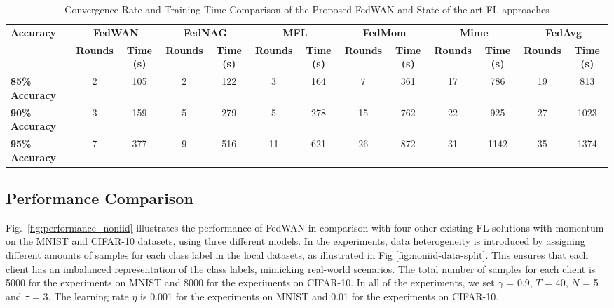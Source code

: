 \documentclass[journal]{IEEEtran}
\begin{document}
\begin{table}[!t]
\centering
\caption{Convergence Rate and Training Time Comparison of the Proposed FedWAN and State-of-the-art FL approaches}
\label{tab:convergence_rate}
\begin{tabular}{lcccccccccccc}
\toprule
\textbf{Accuracy} & \multicolumn{2}{c}{\textbf{FedWAN}} & \multicolumn{2}{c}{\textbf{FedNAG}} & \multicolumn{2}{c}{\textbf{MFL}}  & \multicolumn{2}{c}{\textbf{FedMom}} & \multicolumn{2}{c}{\textbf{Mime}} & \multicolumn{2}{c}{\textbf{FedAvg}} \\
\cmidrule(lr){2-3} \cmidrule(lr){4-5} \cmidrule(lr){6-7} \cmidrule(lr){8-9} \cmidrule(lr){10-11} \cmidrule(lr){12-13}
 & \textbf{Rounds} & \textbf{Time (s)} & \textbf{Rounds} & \textbf{Time (s)} & \textbf{Rounds} & \textbf{Time (s)}  & \textbf{Rounds} & \textbf{Time (s)} & \textbf{Rounds} & \textbf{Time (s)} & \textbf{Rounds} & \textbf{Time (s)} \\
\midrule
\textbf{85\% Accuracy} & 2  & 105  & 2  & 122  & 3  & 164 
                       & 7  & 361  & 17  & 786 & 19  & 813  \\
\textbf{90\% Accuracy} & 3  & 159  & 5  & 279  & 5  & 278  
                       & 15  & 762  & 22  & 925  & 27  & 1023  \\
\textbf{95\% Accuracy} & 7  & 377  & 9  & 516  & 11  & 621  
                       & 26  & 872  & 31  & 1142  & 35  & 1374  \\
\bottomrule
\end{tabular}
\label{tab:fl-accuracy-threshold}
\end{table}

\subsection{Performance Comparison}
Fig.~\ref{fig:performance_noniid} illustrates the performance of FedWAN in comparison with four other existing FL solutions with momentum on the MNIST and CIFAR-10 datasets, using three different models. In the experiments, data heterogeneity is introduced by assigning different amounts of samples for each class label in the local datasets, as illustrated in Fig \ref{fig:noniid-data-split}. This ensures that each client has an imbalanced representation of the class labels, mimicking real-world scenarios. The total number of samples for each client is 5000 for the experiments on MNIST and 8000 for the experiments on CIFAR-10. In all of the experiments, we set $\gamma$ = 0.9, $T$ = 40, $N$ = 5 and $\tau$ = 3. The learning rate $\eta$ is 0.001 for the experiments on MNIST and 0.01 for the experiments on CIFAR-10. 
\end{document}
